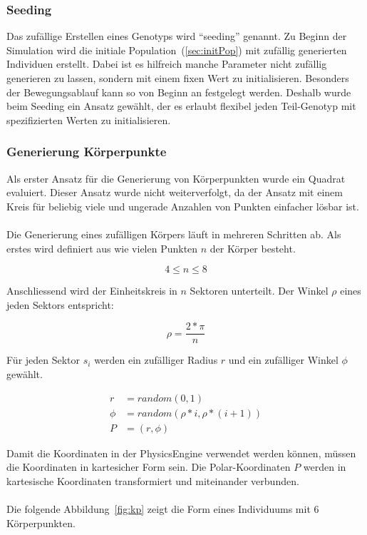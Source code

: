       \subsubsection{Seeding\label{subsub:GenotypeSeeding}}

        Das zufällige Erstellen eines Genotyps wird ``seeding'' genannt.
        Zu Beginn der Simulation wird die initiale Population~(\vref{sec:initPop}) mit zufällig generierten Individuen erstellt.
        Dabei ist es hilfreich manche Parameter nicht zufällig generieren zu lassen,
        sondern mit einem fixen Wert zu initialisieren.
        Besonders der Bewegungsablauf kann so von Beginn an festgelegt werden.
        Deshalb wurde beim Seeding ein Ansatz gewählt, der es erlaubt flexibel jeden Teil-Genotyp mit
        spezifizierten Werten zu initialisieren.

      \subsubsection{Generierung Körperpunkte\label{subsub:GenotypeBodypointCreation}}

        Als erster Ansatz für die Generierung von Körperpunkten wurde ein Quadrat evaluiert.
        Dieser Ansatz wurde nicht weiterverfolgt,
        da der Ansatz mit einem Kreis für beliebig viele und ungerade Anzahlen von Punkten einfacher lösbar ist.
        \\
        \\
        Die Generierung eines zufälligen Körpers läuft in mehreren Schritten ab.
        Als erstes wird definiert aus wie vielen Punkten \( n \) der Körper besteht.

        \[ 4 \leq n \leq 8 \]

        Anschliessend wird der Einheitskreis in \( n \) Sektoren unterteilt.
        Der Winkel \( \rho \) eines jeden Sektors entspricht:

        \[ \rho = \frac{2 * \pi}{n} \]

        Für jeden Sektor \( s_{i} \) werden ein zufälliger Radius \( r \) und ein zufälliger Winkel \( \phi \) gewählt.

        \begin{align*}
          r &= random(0, 1) \\
          \phi &= random(\rho * i, \rho * (i + 1)) \\
          P &= (r, \phi)
        \end{align*}

        Damit die Koordinaten in der \gls{PhysicsEngine} verwendet werden können,
        müssen die Koordinaten in kartesicher Form sein.
        Die Polar-Koordinaten \( P \) werden in kartesische Koordinaten transformiert und miteinander verbunden.
        \\
        \\
        Die folgende Abbildung~\ref{fig:kp} zeigt die Form eines Individuums mit 6 Körperpunkten.

